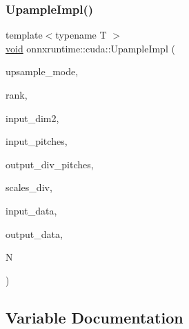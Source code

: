 \mbox{\label{namespaceonnxruntime_1_1cuda_a678bd36af10db05e306d877d311e0747}} 
\subsubsection{\texorpdfstring{Upample\+Impl()}{UpampleImpl()}}
{\footnotesize\ttfamily template$<$typename T $>$ \\
\mbox{\hyperlink{mlasi_8h_a88f941d423cb2a819b70a1358982b1a6}{void}} onnxruntime\+::cuda\+::\+Upample\+Impl (\begin{DoxyParamCaption}\item[{const \mbox{\hyperlink{namespaceonnxruntime_ac1731b73e10b6a91015c32c7e29d03bd}{onnxruntime\+::\+Upsample\+Mode}}}]{upsample\+\_\+mode,  }\item[{const \mbox{\hyperlink{mlasi_8h_a503efbc1c6e50825320ad909366b78ab}{size\+\_\+t}}}]{rank,  }\item[{const int64\+\_\+t}]{input\+\_\+dim2,  }\item[{const int64\+\_\+t $\ast$}]{input\+\_\+pitches,  }\item[{const \mbox{\hyperlink{classonnxruntime_1_1cuda_1_1fast__divmod}{fast\+\_\+divmod}} $\ast$}]{output\+\_\+div\+\_\+pitches,  }\item[{const \mbox{\hyperlink{classonnxruntime_1_1cuda_1_1fast__divmod}{fast\+\_\+divmod}} $\ast$}]{scales\+\_\+div,  }\item[{const T $\ast$}]{input\+\_\+data,  }\item[{T $\ast$}]{output\+\_\+data,  }\item[{const \mbox{\hyperlink{mlasi_8h_a503efbc1c6e50825320ad909366b78ab}{size\+\_\+t}}}]{N }\end{DoxyParamCaption})}



\subsection{Variable Documentation}
\mbox{\label{namespaceonnxruntime_1_1cuda_a272ed1bb036b029ae628321d1ff6bd0a}} 
